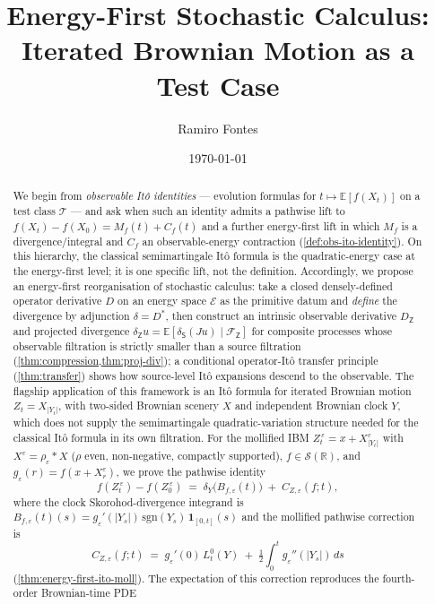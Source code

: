 \documentclass[11pt,reqno]{amsart}
\title{Energy-First Stochastic Calculus:\\
       Iterated Brownian Motion as a Test Case}
\author{Ramiro Fontes}
\date{\today}
\theoremstyle{plain}
\theoremstyle{definition}
\theoremstyle{remark}
\newcommand{\R}{\mathbb{R}}
\newcommand{\E}{\mathbb{E}}
\newcommand{\Energy}{\mathcal{E}}
\newcommand{\Source}{\mathsf{S}}
\newcommand{\Obs}{\mathsf{Z}}
\newcommand{\IBM}{Z}
\begin{document}
\begin{abstract}
We begin from \emph{observable It\^o identities} --- evolution
formulas for $t\mapsto\E[f(X_t)]$ on a test class
$\mathcal T$ --- and ask when such an identity admits a pathwise
lift to $f(X_t)-f(X_0)=M_f(t)+C_f(t)$ and a further energy-first
lift in which $M_f$ is a divergence/integral and $C_f$ an
observable-energy contraction (\cref{def:obs-ito-identity}). On this
hierarchy, the classical semimartingale It\^o formula is the
quadratic-energy case at the energy-first level; it is one
specific lift, not the definition. Accordingly, we propose an
energy-first reorganisation of stochastic calculus: take a closed
densely-defined operator derivative $D$ on an energy space
$\Energy$ as the primitive datum and \emph{define} the divergence by
adjunction $\delta=D^{*}$, then construct an intrinsic observable
derivative $D_\Obs$ and projected divergence
$\delta_\Obs u=\E[\delta_\Source(Ju)\mid\mathcal F_\Obs]$ for
composite processes whose observable filtration is strictly smaller
than a source filtration (\cref{thm:compression,thm:proj-div}); a
conditional operator-It\^o transfer principle (\cref{thm:transfer})
shows how source-level It\^o expansions descend to the observable. The flagship
application of this framework is an It\^o formula for iterated
Brownian motion $\IBM_t=X_{|Y_t|}$, with two-sided Brownian scenery
$X$ and independent Brownian clock $Y$, which does not supply the
semimartingale quadratic-variation structure needed for the
classical It\^o formula in its own filtration. For the mollified IBM
$\IBM_t^{\,\varepsilon}=x+X^\varepsilon_{|Y_t|}$ with
$X^\varepsilon=\rho_\varepsilon*X$ ($\rho$ even, non-negative,
compactly supported), $f\in\mathscr S(\R)$, and
$g_\varepsilon(r)=f(x+X^\varepsilon_r)$, we prove the pathwise
identity
\begin{equation*}
  f(\IBM_t^{\,\varepsilon})-f(\IBM_0^{\,\varepsilon})
   \;=\;\delta_Y\bigl(B_{f,\varepsilon}(t)\bigr)
   \;+\;C_{\IBM,\varepsilon}(f;t),
\end{equation*}
where the clock Skorohod-divergence integrand is
$B_{f,\varepsilon}(t)(s)=g_\varepsilon'(|Y_s|)\,\mathrm{sgn}(Y_s)\,
\mathbf 1_{[0,t]}(s)$ and the mollified pathwise correction is
\begin{equation*}
  C_{\IBM,\varepsilon}(f;t)
   \;=\;g_\varepsilon'(0)\,L_t^{0}(Y)
   \;+\;\tfrac{1}{2}\int_0^{t}g_\varepsilon''(|Y_s|)\,ds
\end{equation*}
(\cref{thm:energy-first-ito-moll}). The expectation of this
correction reproduces the fourth-order Brownian-time PDE

\end{abstract}
\end{document}
